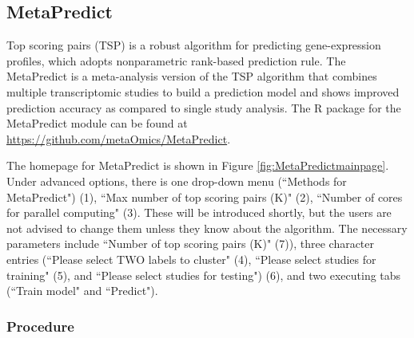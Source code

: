 \subsection{MetaPredict}

Top scoring pairs (TSP) is a robust algorithm for predicting gene-expression profiles,
which adopts nonparametric rank-based prediction rule.
The MetaPredict is a meta-analysis version of the TSP algorithm that combines multiple transcriptomic studies to build a prediction model and shows improved 
prediction accuracy as compared to single study analysis.
The R package for the MetaPredict module can be found at \url{https://github.com/metaOmics/MetaPredict}.

The homepage for MetaPredict is shown in Figure \ref{fig:MetaPredictmainpage}.
Under advanced options,  there is one drop-down menu (``Methods for MetaPredict") {\color{red} (1)}, 
``Max number of top scoring pairs (K)" {\color{red} (2)}, 
``Number of cores for parallel computing" {\color{red} (3)}.
These will be introduced shortly, 
but the users are not advised to change them unless they know about the algorithm.
The necessary parameters include ``Number of top scoring pairs (K)" {\color{red} (7)}), 
three character entries (``Please select TWO labels to cluster" {\color{red} (4)}, 
``Please select studies for training" {\color{red} (5)}, 
and ``Please select studies for testing") {\color{red} (6)}, 
and two executing tabs (``Train model" and ``Predict"). 

\subsubsection{Procedure}

